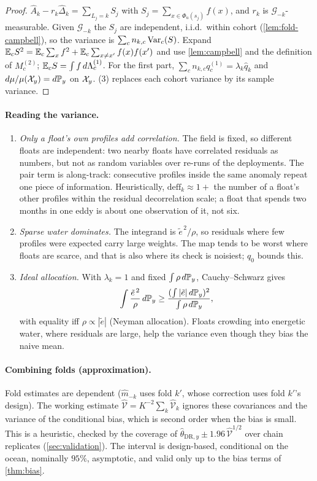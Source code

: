 \begin{proof}
$\hat A_k-r_k\hat\Delta_k=\sum_{L_j=k}S_j$ with $S_j=\sum_{x\in\Phi_u(s_j)}f(x)$, and $r_k$ is
$\mathcal G_{-k}$-measurable. Given $\mathcal G_{-k}$ the $S_j$ are independent, i.i.d.\ within cohort
(\cref{lem:fold-campbell}), so the variance is $\sum_cn_{k,c}\operatorname{Var}_c(S)$. Expand
$\mathbb{E}_cS^2=\mathbb{E}_c\sum_xf^2+\mathbb{E}_c\sum_{x\neq x'}f(x)f(x')$ and use \cref{lem:campbell} and the definition of
$M^{(2)}_c$; $\mathbb{E}_cS=\int f\,d\Lambda^{(1)}_c$. For the first part,
$\sum_cn_{k,c}q^{(1)}_c=\lambda_k\hat q_k$ and $d\mu/\mu(\mathcal{X}_y)=d\mathbb{P}_y$ on $\mathcal{X}_y$. (3) replaces each
cohort variance by its sample variance.
\end{proof}

\paragraph{Reading the variance.}
\begin{enumerate}
  \item \emph{Only a float's own profiles add correlation.} The field is fixed, so different floats are
        independent: two nearby floats have correlated residuals as numbers, but not as random
        variables over re-runs of the deployments. The pair term is along-track: consecutive profiles
        inside the same anomaly repeat one piece of information. Heuristically, $\mathrm{deff}_k\approx1+{}$
        the number of a float's other profiles within the residual decorrelation scale; a float that
        spends two months in one eddy is about one observation of it, not six.
  \item \emph{Sparse water dominates.} The integrand is $\tilde e^{\,2}/\rho$, so residuals where few
        profiles were expected carry large weights. The map tends to be worst where floats are scarce,
        and that is also where its check is noisiest; $q_0$ bounds this.
  \item \emph{Ideal allocation.} With $\lambda_k=1$ and fixed $\int\rho\,d\mathbb{P}_y$, Cauchy--Schwarz gives
        \[
          \int\frac{\tilde e^{\,2}}{\rho}\,d\mathbb{P}_y\ge\frac{(\int|\tilde e|\,d\mathbb{P}_y)^2}{\int\rho\,d\mathbb{P}_y},
        \]
        with equality iff $\rho\propto|\tilde e|$ (Neyman allocation). Floats crowding into energetic
        water, where residuals are large, help the variance even though they bias the naive mean.
\end{enumerate}

\paragraph{Combining folds (approximation).} Fold estimates are dependent ($\hat m_{-k}$ uses fold $k'$,
whose correction uses fold $k'$'s design). The working estimate $\hat{\mathcal V}=K^{-2}\sum_k\hat{\mathcal V}_k$
ignores these covariances and the variance of the conditional bias, which is second order when the
bias is small. This is a heuristic, checked by the coverage of $\hat\theta_{\mathrm{DR},y}\pm1.96\,\hat{\mathcal V}^{1/2}$
over chain replicates (\cref{sec:validation}). The interval is design-based, conditional on the ocean,
nominally $95\%$, asymptotic, and valid only up to the bias terms of \cref{thm:bias}.

